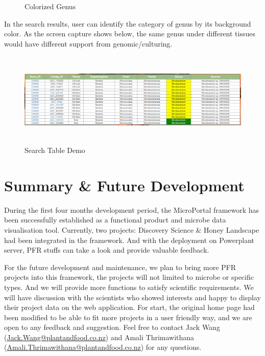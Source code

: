 \documentclass{scrreprt}
\begin{document}
\begin{enumerate}
\begin{figure}[h!]
    \caption{Colorized Genus}
    \label{fig:Start Tour}
\end{figure}
\newline
In the search results, user can identify the category of genus by its background color. As the screen capture shows below, the same genus under different tissues would have different support from genomic/culturing.
\begin{figure}[h!]
    \centering
    \includegraphics[width=15cm,height=4.5cm]{GenusTable.PNG}
    \caption{Search Table Demo}
    \label{fig:Start Tour}
\end{figure}
\end{enumerate}

\chapter{Summary \& Future Development}
During the first four months development period, the MicroPortal framework has been successfully established as a functional product and microbe data visualisation tool. Currently, two projects: Discovery Science \& Honey Landscape had been integrated in the framework. And with the deployment on Powerplant server, PFR stuffs can take a look and provide valuable feedback.

For the future development and maintenance, we plan to bring more PFR projects into this framework, the projects will not limited to microbe or specific types. And we will provide more functions to satisfy scientific requirements. We will have discussion with the scientists who showed interests and happy to display their project data on the web application. For start, the original home page had been modified to be able to fit more projects in a user friendly way, and we are open to any feedback and suggestion. Feel free to contact Jack Wang (\href{mailto:Jack.Wang@plantandfood.co.nz}{Jack.Wang@plantandfood.co.nz}) and Amali Thrimawithana (\href{Amali.Thrimawithana@plantandfood.co.nz}{Amali.Thrimawithana@plantandfood.co.nz}) for any questions.  
\newline
\end{document}
